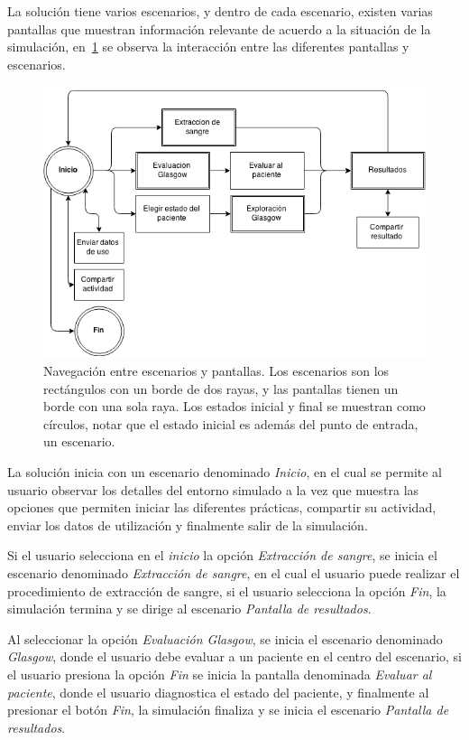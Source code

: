 La solución tiene varios escenarios, y dentro de cada escenario, existen varias
pantallas que muestran información relevante de acuerdo a la situación de la
simulación, en~\ref{fig:grafo_estados} se observa la interacción entre las
diferentes pantallas y escenarios.

\begin{figure}[H] 
\centering 
\includegraphics[scale=0.5]{propuesta/images/grafo_escenas.png}
\caption{Navegación entre escenarios y pantallas. Los escenarios son los
    rectángulos con un borde de dos rayas, y las pantallas tienen un borde con una
    sola raya. Los estados inicial y final se muestran como círculos, notar que
    el estado inicial es además del punto de entrada, un escenario.}
\label{fig:grafo_estados}
\end{figure}

La solución inicia con un escenario denominado \emph{Inicio}, en el cual se
permite al usuario observar los detalles del entorno simulado a la vez que
muestra las opciones que permiten iniciar las diferentes prácticas, compartir
su actividad, enviar los datos de utilización y finalmente salir de la
simulación.

Si el usuario selecciona en el \emph{inicio} la opción \emph{Extracción de
    sangre}, se inicia el escenario denominado \emph{Extracción de sangre}, en
el cual el usuario puede realizar el procedimiento de extracción de sangre, si
el usuario selecciona la opción \emph{Fin}, la simulación termina y se dirige 
al escenario \emph{Pantalla de resultados}.

Al seleccionar la opción \emph{Evaluación Glasgow}, se inicia el escenario
denominado \emph{Glasgow}, donde el usuario debe evaluar a un paciente en el
centro del escenario, si el usuario presiona la opción \emph{Fin} se inicia la
pantalla denominada \emph{Evaluar al paciente}, donde el usuario diagnostica el
estado del paciente, y finalmente al presionar el botón \emph{Fin}, la
simulación finaliza y se inicia el escenario \emph{Pantalla de resultados}.

